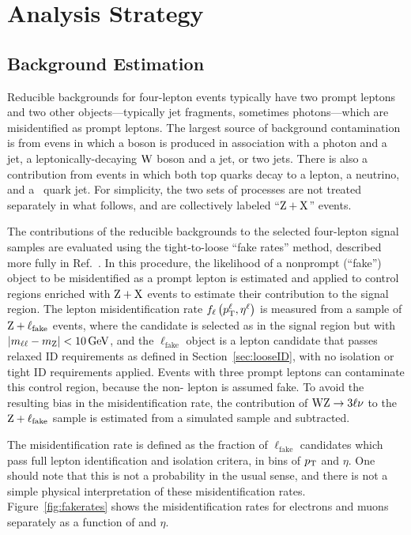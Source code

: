 
\chapter{Analysis Strategy}

\section{Background Estimation}
Reducible backgrounds for four-lepton events typically have two prompt leptons and two other objects---typically jet fragments, sometimes photons---which are misidentified as prompt leptons.
The largest source of background contamination is from evens in which a {\PZ} boson is produced in association with a photon and a jet, a leptonically-decaying $\mathrm{W}$ boson and a jet, or two jets.
There is also a contribution from {\TTbar} events in which both top quarks decay to a lepton, a neutrino, and a {\Pqb}~quark jet.
For simplicity, the two sets of processes are not treated separately in what follows, and are collectively labeled ``$\mathrm{Z}+\mathrm{X}$'' events.

The contributions of the reducible backgrounds to the selected four-lepton signal samples are evaluated using the tight-to-loose ``fake rates'' method, described more fully in Ref.~\cite{Chatrchyan:2013mxa}.
In this procedure, the likelihood of a nonprompt (``fake'') object to be misidentified as a prompt lepton is estimated and applied to control regions enriched with $\mathrm{Z}+\mathrm{X}$ events to estimate their contribution to the signal region.
The lepton misidentification rate $f_\ell\left(p_\mathrm{T}^\ell, \eta^\ell\right)$ is measured from a sample of $\mathrm{Z} + \ell_\text{fake}$ events, where the {\PZ} candidate is selected as in the signal region but with $\left| m_{\ell\ell} - m_\mathrm{Z} \right| < 10\,\mathrm{Ge\hspace{-.08em}V}$, and the $\ell_\text{fake}$ object is a lepton candidate that passes relaxed ID requirements as defined in Section~\ref{sec:looseID}, with no isolation or tight ID requirements applied.
Events with three prompt leptons can contaminate this control region, because the {non-\PZ} lepton is assumed fake.
To avoid the resulting bias in the misidentification rate, the contribution of $\mathrm{W}\mathrm{Z} \to 3\ell\nu$ to the $\mathrm{Z}+\ell_\text{fake}$ sample is estimated from a simulated sample and subtracted.

The misidentification rate is defined as the fraction of $\ell_\text{fake}$ candidates which pass full lepton identification and isolation critera, in bins of $p_\mathrm{T}$ and $\eta$.
One should note that this is not a probability in the usual sense, and there is not a simple physical interpretation of these misidentification rates.
Figure~\ref{fig:fakerates} shows the misidentification rates for electrons and muons separately as a function of {\pt} and $\eta$.

